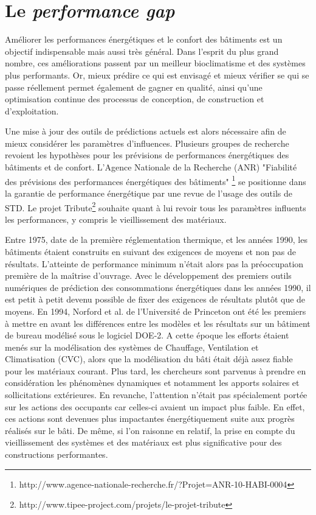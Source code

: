 \section{Le \textit{performance gap}}
\label{performance gap}

Améliorer les performances énergétiques et le confort des bâtiments est un objectif indispensable mais aussi très général. Dans l'esprit du plus grand nombre, ces améliorations passent par un meilleur bioclimatisme et des systèmes plus performants. Or, mieux prédire ce qui est envisagé et mieux vérifier se qui se passe réellement permet également de gagner en qualité, ainsi qu'une optimisation continue des processus de conception, de construction et d'exploitation.

Une mise à jour des outils de prédictions actuels est alors nécessaire afin de mieux considérer les paramètres d'influences. Plusieurs groupes de recherche revoient les hypothèses pour les prévisions de performances énergétiques des bâtiments et de confort. L'Agence Nationale de la Recherche (ANR) "Fiabilité des prévisions des performances énergétiques des bâtiments" \footnote{http://www.agence-nationale-recherche.fr/?Projet=ANR-10-HABI-0004} se positionne dans la garantie de performance énergétique par une revue de l'usage des outils de STD. Le projet Tribute\footnote{http://www.tipee-project.com/projets/le-projet-tribute} souhaite quant à lui revoir tous les paramètres influents les performances, y compris le vieillissement des matériaux.

Entre 1975, date de la première réglementation thermique, et les années 1990, les bâtiments étaient construits en suivant des exigences de moyens et non pas de résultats. L'atteinte de performance minimum n'était alors pas la préoccupation première de la maîtrise d'ouvrage. Avec le développement des premiers outils numériques de prédiction des consommations énergétiques dans les années 1990, il est petit à petit devenu possible de fixer des exigences de résultats plutôt que de moyens. En 1994, Norford et al. \cite{Norford-94} de l'Université de Princeton ont été les premiers à mettre en avant les différences entre les modèles et les résultats sur un bâtiment de bureau modélisé sous le logiciel DOE-2. A cette époque les efforts étaient menés sur la modélisation des systèmes de Chauffage, Ventilation et Climatisation (CVC), alors que la modélisation du bâti était déjà assez fiable pour les matériaux courant. Plus tard, les chercheurs sont parvenus à prendre en considération les phénomènes dynamiques et notamment les apports solaires et sollicitations extérieures. En revanche, l'attention n'était pas spécialement portée sur les actions des occupants car celles-ci avaient un impact plus faible. En effet, ces actions sont devenues plus impactantes énergétiquement suite aux progrès réalisés sur le bâti. De même, si l'on raisonne en relatif, la prise en compte du vieillissement des systèmes et des matériaux est plus significative pour des constructions performantes. 

